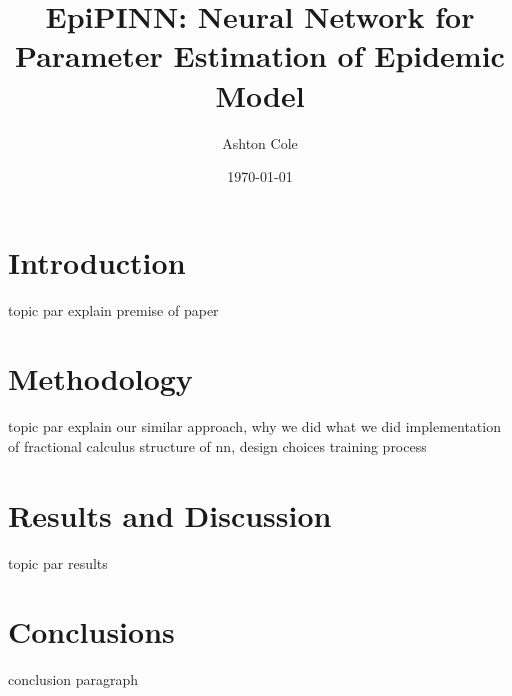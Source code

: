 \documentclass{article}
\title{EpiPINN: Neural Network for Parameter Estimation of Epidemic Model}
\author{Ashton Cole}
\date{\today}
\begin{document}
	\maketitle
	
	\section{Introduction}
	\label{section:Introduction}
	
	topic par
	explain premise of paper
	
	\section{Methodology}
	\label{section:Methodology}
	
	topic par
	explain our similar approach, why we did what we did
	implementation of fractional calculus
	structure of nn, design choices
	training process
	
	\section{Results and Discussion}
	\label{section:Results_and_Discussion}
	
	topic par
	results
	
	\section{Conclusions}
	\label{section:Conclusions}
	
	conclusion paragraph
\end{document}
